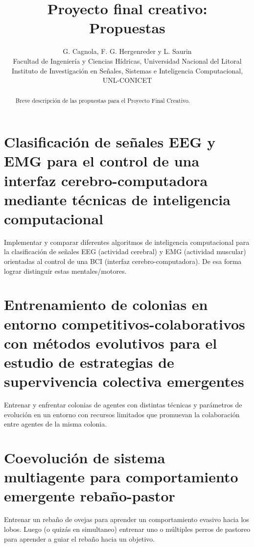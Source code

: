 \documentclass[final]{article}
\begin{document}
\def\tablename{Tabla}          %

\title{Proyecto final creativo:\\
    Propuestas}

\author{G. Cagnola, F. G. Hergenreder y L. Saurin \\
        Facultad de Ingeniería y Ciencias Hídricas,
        Universidad Nacional del Litoral \\
        Instituto de Investigación en Señales, Sistemas e Inteligencia Computacional, UNL-CONICET}

\maketitle

\begin{abstract}
Breve descripción de las propuestas para el Proyecto Final Creativo.
\end{abstract}

\section{Clasificación de señales EEG y EMG para el control de una interfaz cerebro-computadora mediante técnicas de inteligencia computacional}
Implementar y comparar diferentes algoritmos de inteligencia computacional para la clasificación de señales EEG (actividad cerebral) y EMG (actividad muscular) orientadas al control de una BCI (interfaz cerebro-computadora). De esa forma lograr distinguir estas mentales/motores.

\section{Entrenamiento de colonias en entorno competitivos-colaborativos con métodos evolutivos para el estudio de estrategias de supervivencia colectiva emergentes}
Entrenar y enfrentar colonias de agentes con distintas técnicas y parámetros de evolución en un entorno con recursos limitados que promuevan la colaboración entre agentes de la misma colonia.

\section{Coevolución de sistema multiagente para comportamiento emergente rebaño-pastor}
Entrenar un rebaño de ovejas para aprender un comportamiento evasivo hacia los lobos. Luego (o quizás en simultaneo) entrenar uno o múltiples perros de pastoreo para aprender a guiar el rebaño hacia un objetivo.
\end{document}
